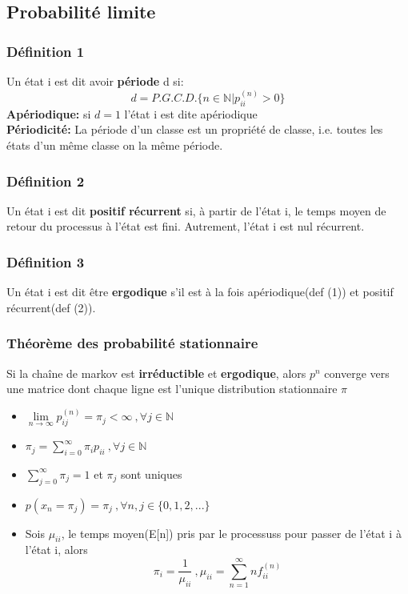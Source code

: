 \documentclass[13pt]{article}
\begin{document}
\subsection*{Probabilité limite}

\subsubsection*{Définition 1}
Un état i est dit avoir \textbf{période} d si:
\[ d = P.G.C.D.\{ n \in \mathbb{N}|p_{ii}^{(n)} > 0 \} \]
\textbf{Apériodique:} si $d=1$ l'état i est dite apériodique\\
\textbf{Périodicité:} La période d'un classe est un propriété de classe, i.e. toutes les états d'un même classe on la même période.

\subsubsection*{Définition 2}
Un état i est dit \textbf{positif récurrent} si, à partir de l'état i, le temps moyen de retour 
du processus à l'état  est fini. Autrement, l'état i est nul récurrent.

\subsubsection*{Définition 3}
Un état i est dit être \textbf{ergodique} s’il est à la fois apériodique(def (1)) et positif récurrent(def (2)).

\subsubsection*{Théorème des probabilité stationnaire}
Si la chaîne de markov est \textbf{irréductible} et \textbf{ergodique}, alors $p^n$ converge vers une matrice dont chaque ligne est l'unique distribution stationnaire $\pi$ 
\begin{itemize}
  \item $\lim\limits_{n \to \infty} p_{ij}^{(n)} = \pi_j < \infty \:,\forall j \in \mathbb{N}$ 
  \item $\pi_j = \sum\limits_{i=0}^\infty \pi_i p_{ii} \:,\forall j \in \mathbb{N}$
  \item $\sum\limits_{j=0}^\infty \pi_j = 1$ et $\pi_j$ sont uniques
  \item $p(x_{n} = \pi_j) = \pi_j \:, \forall n,j \in \{0,1,2,... \}$
  \item Sois $\mu_{ii}$, le temps moyen(E[n]) pris par le processuss pour passer de l'état i à l'état i, alors
  \[ \pi_i = \frac{1}{\mu_{ii}} \:,\mu_{ii} = \sum_{n=1}^\infty n f_{ii}^{(n)} \]
\end{itemize}
\end{document}
